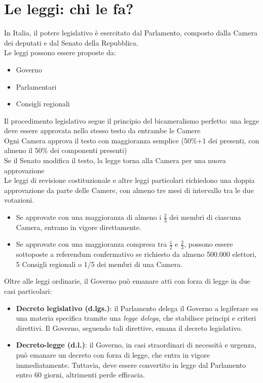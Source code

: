 \documentclass[10pt,oneside,a4paper]{article}
\begin{document}
	\section{Le leggi: chi le fa?}
	In Italia, il potere legislativo è esercitato dal Parlamento, composto dalla Camera dei deputati e dal Senato della Repubblica.  \\
	Le leggi possono essere proposte da:  
	\begin{itemize}
		\item Governo  
		\item Parlamentari  
		\item Consigli regionali
	\end{itemize}
	Il procedimento legislativo segue il principio del bicameralismo perfetto: una legge deve essere approvata nello stesso testo da entrambe le Camere\\  
	Ogni Camera approva il testo con maggioranza semplice (50\%+1 dei presenti, con almeno il 50\% dei componenti presenti)\\
	Se il Senato modifica il testo, la legge torna alla Camera per una nuova approvazione\\
	Le leggi di revisione costituzionale e altre leggi particolari richiedono una doppia approvazione da parte delle Camere, con almeno tre mesi di intervallo tra le due votazioni. 
	\begin{itemize}
		\item Se approvate con una maggioranza di almeno i \(\frac{2}{3}\) dei membri di ciascuna Camera, entrano in vigore direttamente.  
		\item Se approvate con una maggioranza compresa tra \(\frac{1}{2}\) e \(\frac{2}{3}\), possono essere sottoposte a referendum confermativo se richiesto da almeno 500.000 elettori, 5 Consigli regionali o 1/5 dei membri di una Camera.  
	\end{itemize}
	Oltre alle leggi ordinarie, il Governo può emanare atti con forza di legge in due casi particolari:  
	\begin{itemize}
		\item \textbf{Decreto legislativo (d.lgs.)}: il Parlamento delega il Governo a legiferare su una materia specifica tramite una \textit{legge delega}, che stabilisce principi e criteri direttivi. Il Governo, seguendo tali direttive, emana il decreto legislativo.  
		\item \textbf{Decreto-legge (d.l.)}: il Governo, in casi straordinari di necessità e urgenza, può emanare un decreto con forza di legge, che entra in vigore immediatamente. Tuttavia, deve essere convertito in legge dal Parlamento entro 60 giorni, altrimenti perde efficacia.  
	\end{itemize}
\end{document}
